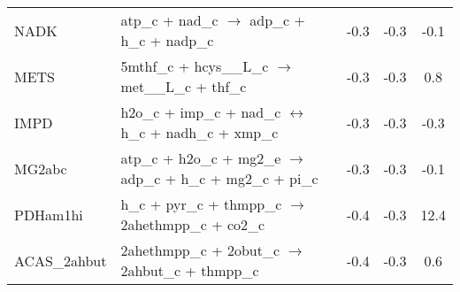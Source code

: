 \begin{longtable}{lp{}ccc}
NADK	&	atp\_c + nad\_c $\rightarrow$ adp\_c + h\_c + nadp\_c	&	-0.3	&	-0.3	&	-0.1	\\
METS	&	5mthf\_c + hcys\_\_L\_c $\rightarrow$ met\_\_L\_c + thf\_c	&	-0.3	&	-0.3	&	0.8	\\
IMPD	&	h2o\_c + imp\_c + nad\_c $\leftrightarrow$ h\_c + nadh\_c + xmp\_c	&	-0.3	&	-0.3	&	-0.3	\\
MG2abc	&	atp\_c + h2o\_c + mg2\_e $\rightarrow$ adp\_c + h\_c + mg2\_c + pi\_c	&	-0.3	&	-0.3	&	-0.1	\\
PDHam1hi	&	h\_c + pyr\_c + thmpp\_c $\rightarrow$ 2ahethmpp\_c + co2\_c	&	-0.4	&	-0.3	&	12.4	\\
ACAS\_2ahbut	&	2ahethmpp\_c + 2obut\_c $\rightarrow$ 2ahbut\_c + thmpp\_c	&	-0.4	&	-0.3	&	0.6	\\

\end{longtable}
